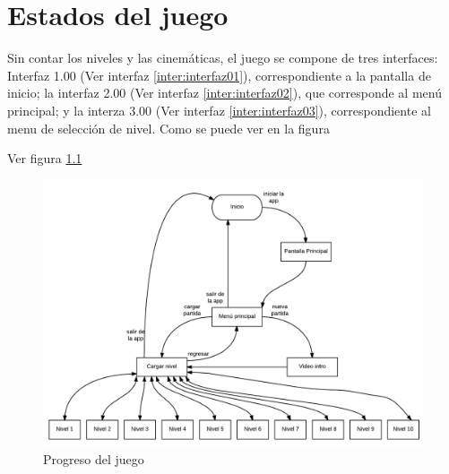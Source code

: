 \chapter{Estados del juego}
Sin contar los niveles y las cinemáticas, el juego se compone de tres interfaces: Interfaz 1.00 (Ver interfaz \ref{inter:interfaz01}), correspondiente a la pantalla de inicio; la interfaz 2.00 (Ver interfaz \ref{inter:interfaz02}), que corresponde al menú principal; y la interza 3.00 (Ver interfaz \ref{inter:interfaz03}), correspondiente al menu de selección de nivel. Como se puede ver en la figura %

Ver figura \ref{fig:EstadosJuego}
\begin{figure}
  \centering
     \includegraphics[width=\linewidth]{Imagenes/estadosJuego}
  \caption{Progreso del juego}
  \label{fig:EstadosJuego}
\end{figure}  
